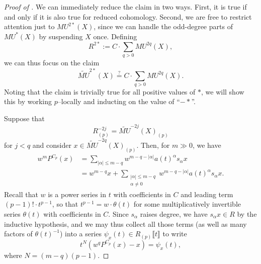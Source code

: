 \begin{proof}[{Proof of }]
We can immediately reduce the claim in two ways.  First, it is true if and only if it is also true for reduced cohomology.  Second, we are free to restrict attention just to \(MU^{2*}(X)\), since we can handle the odd-degree parts of \(MU^*(X)\) by suspending \(X\) once.  Defining \[R^{2*} := C \cdot \sum_{q > 0} MU^{2q}(X),\] we can thus focus on the claim \[\widetilde{MU}^{2*}(X) \stackrel{?}{=} C \cdot \sum_{q > 0} MU^{2q}(X).\]  Noting that the claim is trivially true for all positive values of \(*\), we will show this by working \(p\)--locally and inducting on the value of ``\(-*\)''.

Suppose that \[R^{-2j}_{(p)} = \widetilde{MU}^{-2j}(X)_{(p)}\] for \(j < q\) and consider \(x \in \widetilde{MU}^{-2q}(X)_{(p)}\).  Then, for \(m \gg 0\), we have
\begin{align*}
w^m P^{C_p}(x) & = \sum_{|\alpha| \le m-q} w^{m-q - |\alpha|} a(t)^\alpha s_\alpha x \\
& = w^{m-q} x + \sum_{\substack{|\alpha| \le m-q \\ \alpha \ne 0}} w^{m-q - |\alpha|} a(t)^\alpha s_\alpha x.
\end{align*}
Recall that \(w\) is a power series in \(t\) with coefficients in \(C\) and leading term \((p-1)! \cdot t^{p-1}\), so that \(t^{p-1} = w \cdot \theta(t)\) for some multiplicatively invertible series \(\theta(t)\) with coefficients in \(C\).  Since \(s_\alpha\) raises degree, we have \(s_\alpha x \in R\) by the inductive hypothesis, and we may thus collect all those terms (as well as many factors of \(\theta(t)^{-1}\)) into a series \(\psi_x(t) \in R_{(p)}\llbracket t \rrbracket\) to write \[t^N(w^q P^{C_p}(x) - x) = \psi_x(t),\] where \(N = (m-q)(p-1)\).


\end{proof}
